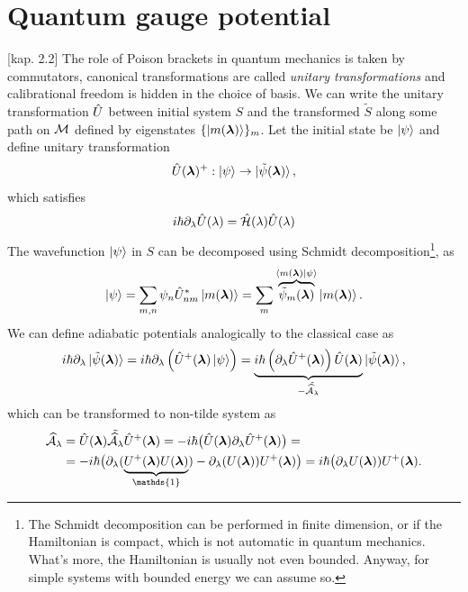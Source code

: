 \section{Quantum gauge potential}
\citep{kolodrubez}[kap. 2.2]
The role of Poison brackets in quantum mechanics is taken by commutators, canonical transformations are called \emph{unitary transformations} and calibrational freedom is hidden in the choice of basis. We can write the unitary transformation $\hat{U}$ between initial system $S$ and the transformed $\tilde{S}$ along some path on $\mathcal{M}$ defined by eigenstates $\{\ket{m({\bm\lambda})}\}_m$. Let the initial state be $\ket{\psi}$ and define unitary transformation
\begin{equation}
    \hat{U}({\bm\lambda})^+: \ket{\psi} \rightarrow \ket{\tilde\psi({\bm\lambda})},
    \label{eq:transformationU}
\end{equation}
which satisfies
\begin{equation}
    i\hbar \partial_\lambda \hat{U}(\lambda)=\hat{\mathcal{H}}(\lambda)\hat{U}(\lambda)
\end{equation}
The wavefunction $\ket{\psi}$ in $S$ can be decomposed using Schmidt decomposition\footnote{The Schmidt decomposition can be performed in finite dimension, or if the Hamiltonian is compact, which is not automatic in quantum mechanics. What's more, the Hamiltonian is usually not even bounded. Anyway, for simple systems with bounded energy we can assume so.}, as
\begin{equation}
    \ket{\psi} = \sum_{m,n}\psi_n \hat{U}_{nm}^*\ket{m({\bm\lambda})} = \sum_m \overbrace{\tilde{\psi}_m({\bm\lambda})}^{\braket{m({\bm\lambda})|\psi}}\ket{m({\bm\lambda})}.
\end{equation}
We can define adiabatic potentials analogically to the classical case as
\begin{equation}
    i\hbar\partial_\lambda \ket{\tilde{\psi}({\bm\lambda})} = i\hbar \partial_\lambda\left(\hat{U}^+({\bm\lambda})\ket{\psi} \right)= \underbrace{i\hbar\left(\partial_\lambda \hat{U}^+({\bm\lambda})\right)\hat{U}({\bm\lambda})}_{-\tilde{\mathcal{\widehat{A}}_\lambda}}\ket{\tilde{\psi}({\bm\lambda})},
\end{equation}
which can be transformed to non-tilde system as
\begin{equation}
    \begin{split}
        \AA_\lambda&=\U(\llambda)\tilde{\AA_\lambda}\U^+(\llambda) = -i\hbar\big(\U(\llambda)\partial_\lambda \U^+(\llambda)\big) =\\
        &= -i\hbar\big(\partial_\lambda(\underbrace{U^+(\llambda)U(\llambda)}_{\mathds{1}})-\partial_\lambda(U(\llambda))U^+(\llambda) \big) =i\hbar \big(\partial_\lambda U(\llambda))U^+(\llambda).
    \end{split}
\end{equation}
